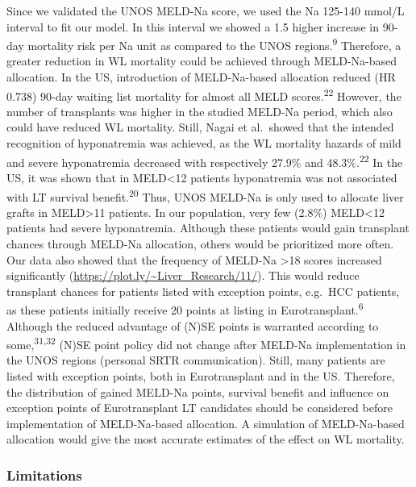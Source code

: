 \documentclass[11pt,english,]{book} %
\begin{document}
Since we validated the UNOS MELD-Na score, we used the Na 125-140 mmol/L interval to fit our model. In this interval we showed a 1.5 higher increase in 90-day mortality risk per Na unit as compared to the UNOS regions.\textsuperscript{9} Therefore, a greater reduction in WL mortality could be achieved through MELD-Na-based allocation. In the US, introduction of MELD-Na-based allocation reduced (HR 0.738) 90-day waiting list mortality for almost all MELD scores.\textsuperscript{22} However, the number of transplants was higher in the studied MELD-Na period, which also could have reduced WL mortality. Still, Nagai et al.~showed that the intended recognition of hyponatremia was achieved, as the WL mortality hazards of mild and severe hyponatremia decreased with respectively 27.9\% and 48.3\%.\textsuperscript{22} In the US, it was shown that in MELD\textless12 patients hyponatremia was not associated with LT survival benefit.\textsuperscript{20} Thus, UNOS MELD-Na is only used to allocate liver grafts in MELD\textgreater11 patients. In our population, very few (2.8\%) MELD\textless12 patients had severe hyponatremia. Although these patients would gain transplant chances through MELD-Na allocation, others would be prioritized more often. Our data also showed that the frequency of MELD-Na \textgreater18 scores increased significantly (\url{https://plot.ly/~Liver_Research/11/}). This would reduce transplant chances for patients listed with exception points, e.g.~HCC patients, as these patients initially receive 20 points at listing in Eurotransplant.\textsuperscript{6} Although the reduced advantage of (N)SE points is warranted according to some,\textsuperscript{31,32} (N)SE point policy did not change after MELD-Na implementation in the UNOS regions (personal SRTR communication). Still, many patients are listed with exception points, both in Eurotransplant and in the US. Therefore, the distribution of gained MELD-Na points, survival benefit and influence on exception points of Eurotransplant LT candidates should be considered before implementation of MELD-Na-based allocation. A simulation of MELD-Na-based allocation would give the most accurate estimates of the effect on WL mortality.

\hypertarget{limitations}{%
\subsubsection*{Limitations}\label{limitations}}
\end{document}
